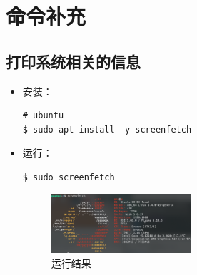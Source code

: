\chapter{命令补充}

\section{打印系统相关的信息}
\begin{itemize}
\item 安装：
\begin{lstlisting}
# ubuntu 
$ sudo apt install -y screenfetch 
\end{lstlisting}

\item 运行：
\begin{lstlisting}
$ sudo screenfetch
\end{lstlisting}


\begin{figure}[hbt!] 
    \centering
    \includegraphics[width=0.49\textwidth]{./img/screenfetch/ubuntu.png}
    \caption{运行结果} %
    \label{fig:ubuntu_screenfetch} %
\end{figure}
\end{itemize}
\newpage

